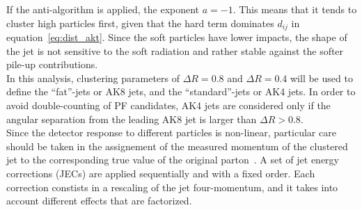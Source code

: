 If the anti-\kt algorithm is applied, the exponent $a = -1$. This means that it tends to cluster high \pt particles first, given that the hard term dominates $d_{ij}$ in equation~\ref{eq:dist_akt}. Since the soft particles have lower impacts, the shape of the jet is not sensitive to the soft radiation and rather stable against the softer pile-up contributions.\\
In this analysis, clustering parameters of $\Delta R = 0.8$ and $\Delta R = 0.4$ will be used to define the ``fat''-jets or AK8 jets, and the ``standard''-jets or AK4 jets. In order to avoid double-counting of PF candidates, AK4 jets are considered only if the angular separation from the leading AK8 jet is larger than $\Delta R>0.8$.\\
Since the detector response to different particles is non-linear, particular care should be taken in the assignement of the measured momentum of the clustered jet to the corresponding true value of the original parton~\cite{bib:1748-0221-6-11-P11002}. A set of jet energy corrections (JECs) are applied sequentially and with a fixed order. Each correction constists in a rescaling of the jet four-momentum, and it takes into account different effects that are factorized.
